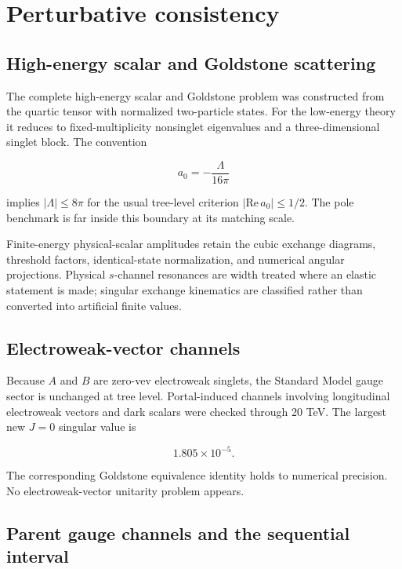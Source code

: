 \documentclass[
]{article}
\begin{document}
\hypertarget{perturbative-consistency}{%
\section{Perturbative consistency}\label{perturbative-consistency}}

\hypertarget{high-energy-scalar-and-goldstone-scattering}{%
\subsection{High-energy scalar and Goldstone
scattering}\label{high-energy-scalar-and-goldstone-scattering}}

The complete high-energy scalar and Goldstone problem was constructed
from the quartic tensor with normalized two-particle states. For the
low-energy theory it reduces to fixed-multiplicity nonsinglet
eigenvalues and a three-dimensional singlet block. The convention

\[
a_0=-\frac{\Lambda}{16\pi}
\]

implies \(|\Lambda|\leq8\pi\) for the usual tree-level criterion
\(|\mathrm{Re}\,a_0|\leq1/2\). The pole benchmark is far inside this
boundary at its matching scale.

Finite-energy physical-scalar amplitudes retain the cubic exchange
diagrams, threshold factors, identical-state normalization, and
numerical angular projections. Physical \(s\)-channel resonances are
width treated where an elastic statement is made; singular exchange
kinematics are classified rather than converted into artificial finite
values.

\hypertarget{electroweak-vector-channels}{%
\subsection{Electroweak-vector
channels}\label{electroweak-vector-channels}}

Because \(A\) and \(B\) are zero-vev electroweak singlets, the Standard
Model gauge sector is unchanged at tree level. Portal-induced channels
involving longitudinal electroweak vectors and dark scalars were checked
through 20 TeV. The largest new \(J=0\) singular value is

\[
1.805\times10^{-5}.
\]

The corresponding Goldstone equivalence identity holds to numerical
precision. No electroweak-vector unitarity problem appears.

\hypertarget{parent-gauge-channels-and-the-sequential-interval}{%
\subsection{Parent gauge channels and the sequential
interval}\label{parent-gauge-channels-and-the-sequential-interval}}
\end{document}
